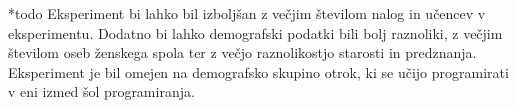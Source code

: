 \documentclass[a4paper,12pt,openright]{book}
\begin{document}
*todo
Eksperiment bi lahko bil izboljšan z večjim številom nalog in učencev v eksperimentu. Dodatno bi lahko demografski podatki bili bolj raznoliki, z večjim številom oseb ženskega spola ter z večjo raznolikostjo starosti in predznanja. Eksperiment je bil omejen na demografsko skupino otrok, ki se učijo programirati v eni izmed šol programiranja.

\printbibliography[heading=bibintoc,title={Literatura}]
\end{document}
